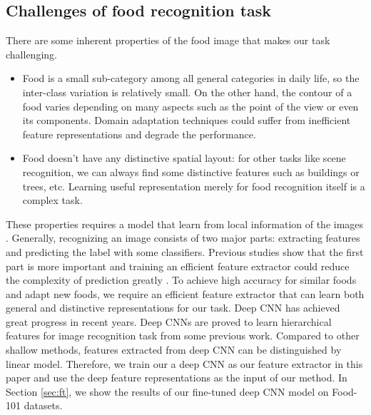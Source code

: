 \subsection{Challenges of food recognition task}
There are some inherent properties of the food image that makes our task challenging.
\begin{itemize}
 \item Food is a small sub-category among all general categories in daily life, so the inter-class variation is relatively small. On the other hand, the contour of a food varies depending on many aspects such as the point of the view or even its components. Domain adaptation techniques could suffer from inefficient feature representations and degrade the performance.
  \item Food doesn't have any distinctive spatial layout: for other tasks like scene recognition, we can always find some distinctive features such as buildings or trees, etc. Learning useful representation merely for food recognition itself is a complex task.
\end{itemize}
These properties requires a model that learn from local information of the images \cite{bossard2014food}. Generally, recognizing an image consists of two major parts: extracting features and predicting the label with some classifiers. Previous studies show that the first part is more important and training an efficient feature extractor could reduce the complexity of prediction greatly\cite{zeiler2014visualizing} \cite{simonyan2014very}. To achieve high accuracy for similar foods and adapt new foods, we require an efficient feature extractor that can learn both general and distinctive representations for our task. Deep CNN has achieved great progress in recent years. Deep CNNs are proved to learn hierarchical features for image recognition task from some previous work\cite{zeiler2010deconvolutional}\cite{krizhevsky2012imagenet}\cite{CiresanIJCAI11}. Compared to other shallow methods, features extracted from deep CNN can be distinguished by linear model. Therefore, we train our a deep CNN as our feature extractor in this paper and use the deep feature representations as the input of our method. In Section \ref{sec:ft}, we show the results of our fine-tuned deep CNN model on Food-101 datasets.
